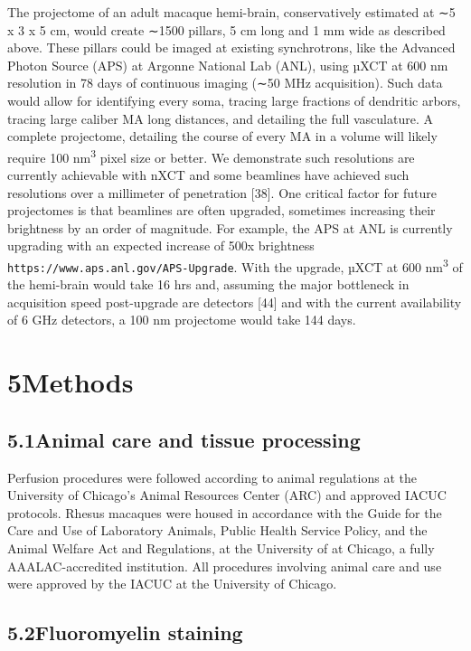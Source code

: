 \documentclass{article}
\begin{document}
The projectome of an adult macaque hemi-brain, conservatively estimated at ∼5 x 3 x 5 cm, would create ∼1500 pillars, 5 cm long and 1 mm wide as described above. These pillars could be imaged at existing synchrotrons, like the Advanced Photon Source (APS) at Argonne National Lab (ANL), using µXCT at 600 nm resolution in 78 days of continuous imaging (∼50 MHz acquisition). Such data would allow for identifying every soma, tracing large fractions of dendritic arbors, tracing large caliber MA long distances, and detailing the full vasculature. A complete projectome, detailing the course of every MA in a volume will likely require 100 nm\textsuperscript{3} pixel size or better. We demonstrate such resolutions are currently achievable with nXCT and some beamlines have achieved such resolutions over a millimeter of penetration [38]. One critical factor for future projectomes is that beamlines are often upgraded, sometimes increasing their brightness by an order of magnitude. For example, the APS at ANL is currently upgrading with an expected increase of 500x brightness \texttt{https://www.aps.anl.gov/APS-Upgrade}. With the upgrade, µXCT at 600 nm\textsuperscript{3} of the hemi-brain would take 16 hrs and, assuming the major bottleneck in acquisition speed post-upgrade are detectors [44] and with the current availability of 6 GHz detectors, a 100 nm projectome would take 144 days.

\section*{5\quad Methods}

\subsection*{5.1\quad Animal care and tissue processing}

Perfusion procedures were followed according to animal regulations at the University of Chicago’s Animal Resources Center (ARC) and approved IACUC protocols. Rhesus macaques were housed in accordance with the Guide for the Care and Use of Laboratory Animals, Public Health Service Policy, and the Animal Welfare Act and Regulations, at the University of at Chicago, a fully AAALAC-accredited institution. All procedures involving animal care and use were approved by the IACUC at the University of Chicago.

\subsection*{5.2\quad Fluoromyelin staining}
\end{document}
